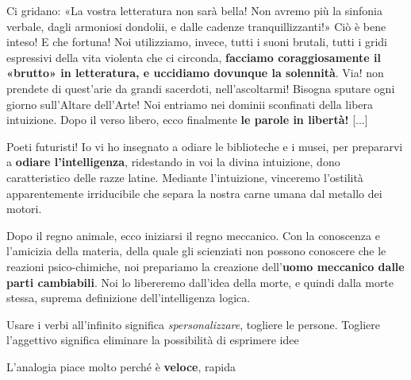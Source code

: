 \documentclass[a4paper, twoside, titlepage]{book}
\begin{document}
{Ci gridano: «La vostra letteratura non sarà bella! Non avremo più la sinfonia verbale, dagli armoniosi dondolii, e dalle cadenze tranquillizzanti!» Ciò è bene inteso! E che fortuna! Noi utilizziamo, invece, tutti i suoni brutali, tutti i gridi espressivi della vita violenta che ci circonda, \textbf{facciamo coraggiosamente il «brutto» in letteratura, e uccidiamo dovunque la solennità}. Via! non prendete di quest’arie da grandi sacerdoti, nell’ascoltarmi! Bisogna sputare ogni giorno sull’Altare dell’Arte! Noi entriamo nei dominii sconfinati della libera intuizione. Dopo il verso libero, ecco finalmente \textbf{le parole in libertà!} [...]

Poeti futuristi! Io vi ho insegnato a odiare le biblioteche e i musei, per prepararvi a \textbf{odiare l’intelligenza}, ridestando in voi la divina intuizione, dono caratteristico delle razze latine. Mediante l’intuizione, vinceremo l’ostilità apparentemente irriducibile che separa la nostra carne umana dal metallo dei motori.

Dopo il regno animale, ecco iniziarsi il regno meccanico. Con la conoscenza e l’amicizia della materia, della quale gli scienziati non possono conoscere che le reazioni psico-chimiche, noi prepariamo la creazione dell’\textbf{uomo meccanico dalle parti cambiabili}. Noi lo libereremo dall’idea della morte, e quindi dalla morte stessa, suprema definizione dell’intelligenza logica.
}

Usare i verbi all’infinito significa \textit{spersonalizzare}, togliere le persone. Togliere l’aggettivo significa eliminare la possibilità di esprimere idee

L’analogia piace molto perché è \textbf{veloce}, rapida
\end{document}
